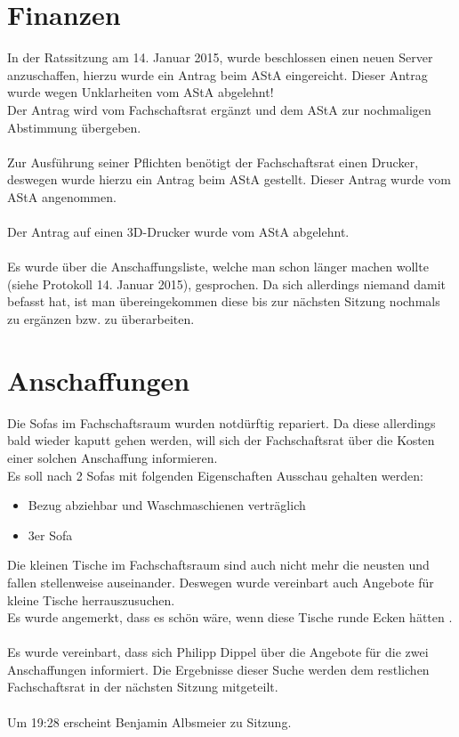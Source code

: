 \documentclass[a4paper, 11pt]{article} %
\newcommand{\abstimmung}[4]{
	\newcounter{summe}
	\setcounter{summe}{#3}
	\addtocounter{summe}{#4}
	\begin{flushleft}
		#1\\
	Es wird über den Antrag abgestimmt.
	\end{flushleft}
	\ifthenelse{\equal{#3}{0}\AND\equal{#4}{0}}{
	\begin{center}
		\textbf{Der Antrag wird einstimmig angenommen.}
	\end{center}
	}{
	\begin{center}
		#2 \ifthenelse{\equal{#2}{1}}{Stimme}{Stimmen} dafür, #3 \ifthenelse{\equal{#3}{1}}{Stimme}{Stimmen} dagegen, #4 \ifthenelse{\equal{#42}{1}}{Enthaltung}{Enthaltungen}\\
		\ifthenelse{#2>\value{summe}}{
		\textbf{Der Antrag ist somit angenommen.}
		}{
		\textbf{Der Antrag ist somit abgelehnt.}
		}
	\end{center}
	}  
}
\begin{document}
\section{Finanzen}
In der Ratssitzung am 14. Januar 2015, wurde beschlossen einen neuen Server anzuschaffen, hierzu wurde ein Antrag beim AStA eingereicht. Dieser Antrag wurde wegen Unklarheiten vom AStA abgelehnt! \\
Der Antrag wird vom Fachschaftsrat ergänzt und dem AStA zur nochmaligen Abstimmung übergeben. \\
\\
Zur Ausführung seiner Pflichten benötigt der Fachschaftsrat einen Drucker, deswegen wurde hierzu ein Antrag beim AStA gestellt. Dieser Antrag wurde vom AStA angenommen. \\
\\
Der Antrag auf einen 3D-Drucker wurde vom AStA abgelehnt. \\
\\
Es wurde über die Anschaffungsliste, welche man schon länger machen wollte (siehe Protokoll 14. Januar 2015), gesprochen. Da sich allerdings niemand damit befasst hat, ist man übereingekommen diese bis zur nächsten Sitzung nochmals zu ergänzen bzw. zu überarbeiten. \\

\section{Anschaffungen}

Die Sofas im Fachschaftsraum wurden notdürftig repariert. Da diese allerdings bald wieder kaputt gehen werden, will sich der Fachschaftsrat über die Kosten einer solchen Anschaffung informieren. \\
Es soll nach 2 Sofas mit folgenden Eigenschaften Ausschau gehalten werden: 
\begin{itemize}
	\item Bezug abziehbar und Waschmaschienen verträglich
	\item 3er Sofa \\
\end{itemize}
Die kleinen Tische im Fachschaftsraum sind auch nicht mehr die neusten und fallen stellenweise auseinander. Deswegen wurde vereinbart auch Angebote für kleine Tische herrauszusuchen. \\
Es wurde angemerkt, dass es schön wäre, wenn diese Tische runde Ecken hätten . \\
\\
Es wurde vereinbart, dass sich Philipp Dippel über die Angebote für die zwei Anschaffungen informiert. Die Ergebnisse dieser Suche werden dem restlichen Fachschaftsrat in der nächsten Sitzung mitgeteilt. \\
\\
Um 19:28 erscheint Benjamin Albsmeier zu Sitzung. \\
\end{document}
